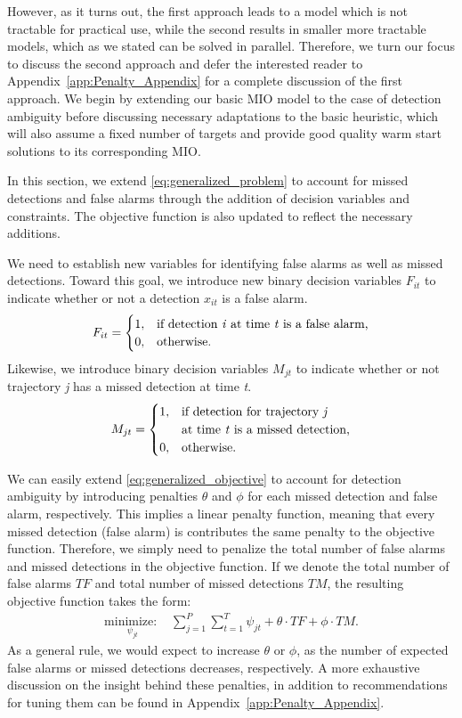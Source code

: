 However, as it turns out, the first approach leads to a model which is not tractable for practical use, while the second results in smaller more tractable models, which as we stated can be solved in parallel.
Therefore, we turn our focus to discuss the second approach and defer the interested reader to Appendix~\ref{app:Penalty_Appendix} for a complete discussion of the first approach. We begin by extending our basic MIO model to the case of detection ambiguity before discussing necessary adaptations to the basic heuristic, which will also assume a fixed number of targets and provide good quality warm start solutions to its corresponding MIO. 

In this section, we extend \eqref{eq:generalized_problem} to account for missed detections and false alarms through the addition of decision variables and constraints. The objective function is also updated to reflect the necessary additions. 

We need to establish new variables for identifying false alarms as well as missed detections. Toward this goal, we introduce new binary decision variables $F_{it}$ to indicate whether or not a detection $x_{it}$ is a false alarm. 
\[F_{it} = 
\begin{cases}
1, & \text{if detection \textit{i} at time \textit{t} is a false alarm,}\\
0, & \text{otherwise.}
\end{cases}\]
Likewise, we introduce binary decision variables $M_{jt}$ to indicate whether or not trajectory \textit{j} has a missed detection at time \textit{t}.
\[M_{jt} =
\begin{cases}
1, & \text{if detection for trajectory \textit{j}}\\
   &\text{at time \textit{t} is a missed detection,}\\
0, & \text{otherwise.}
\end{cases}\]

We can easily extend \eqref{eq:generalized_objective} to account for detection ambiguity by introducing penalties $\theta$ and $\phi$ for each missed detection and false alarm, respectively. This implies a linear penalty function, meaning that every missed detection (false alarm) is contributes the same penalty to the objective function. Therefore, we simply need to penalize the total number of false alarms and missed detections in the objective function. If we denote the total number of false alarms $TF$ and total number of missed detections $TM$, the resulting objective function takes the form:
\begin{align}\label{eq: general_objective}
\underset{\psi_{jt}}{\text{minimize: }} & \sum_{j=1}^{P} \sum_{t=1}^{T} \psi_{jt} + \theta \cdot TF + \phi \cdot TM.
\end{align}
As a general rule, we would expect to increase $\theta$ or $\phi$, as the number of expected false alarms or missed detections decreases, respectively. A more exhaustive discussion on the insight behind these penalties, in addition to recommendations for tuning them can be found in Appendix~\ref{app:Penalty_Appendix}.

